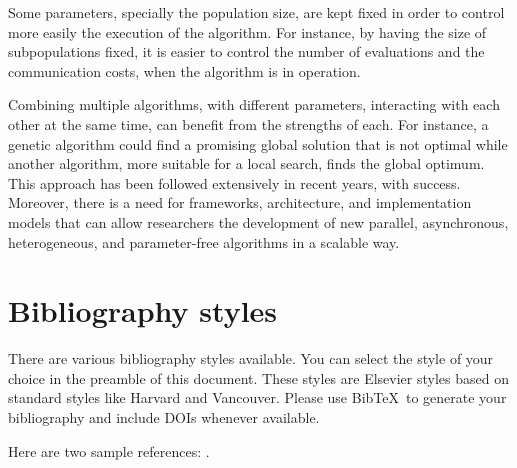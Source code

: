 \documentclass[review]{elsarticle}
\begin{document}
Some parameters, specially the population size, are
kept fixed in order to control more easily the execution of the algorithm. For
instance, by having the size of subpopulations fixed, it is easier to control
the number of evaluations and the communication costs, when the algorithm is in
operation.

Combining multiple algorithms, with different parameters, interacting with each
other at the same time, can benefit from the strengths of each. For instance, a
genetic algorithm could find a promising global solution that is not optimal
while another algorithm, more suitable for a local search, finds the global
optimum. This approach has been followed extensively in recent years, with
success. Moreover, there is a need for frameworks, architecture, and
implementation models that can allow researchers the development of new
parallel, asynchronous, heterogeneous, and parameter-free algorithms in a scalable way.  

\section{Bibliography styles}

There are various bibliography styles available. You can select the style of your choice in the preamble of this document. These styles are Elsevier styles based on standard styles like Harvard and Vancouver. Please use Bib\TeX\ to generate your bibliography and include DOIs whenever available.

Here are two sample references: \cite{Feynman1963118,Dirac1953888}.



\end{document}
